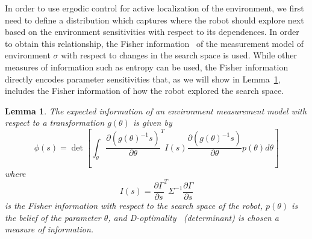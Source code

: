 \documentclass[conference]{IEEEtran}
\newtheorem{lemma}{Lemma}
\begin{document}
In order to use ergodic control for active localization of the environment, we first need to define a distribution which captures where the robot should explore next based on the environment sensitivities with respect to its dependences.
In order to obtain this relationship, the Fisher information~\cite{fedorov2010optimal, chirikjian2000engineering, akaike1998information} of the measurement model of environment $\sigma$ with respect to changes in the search space is used.
While other measures of information such as entropy can be used, the Fisher information directly encodes parameter sensitivities that, as we will show in Lemma~\ref{lem1}, includes the Fisher information of how the robot explored the search space.
\begin{lemma}
\label{lem1}
{ \it The expected information of an environment measurement model with respect to a transformation $g(\theta)$ is given by
\begin{equation}\label{eq:target_eid}
\phi(s) = \det \left[ \int_\theta  \frac{\partial \left( g(\theta)^{-1} s \right) }{\partial \theta}^T I(s) \frac{\partial \left( g(\theta)^{-1} s \right)}{\partial \theta} p(\theta) d\theta \right]
\end{equation}
where
\begin{equation*}
I(s) =  \frac{\partial \Gamma}{\partial s}^T \Sigma^{-1} \frac{\partial \Gamma}{\partial s}
\end{equation*}
is the Fisher information with respect to the search space of the robot, $p(\theta)$ is the belief of the parameter $\theta$, and D-optimality~\cite{john1975d,fedorov2010optimal} (determinant) is chosen a measure of information.
}
\end{lemma}
\end{document}
